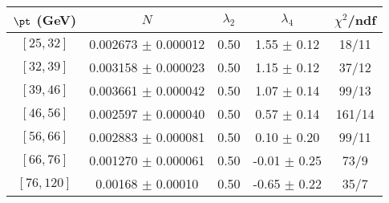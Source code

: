 \begin{tabular}{c||c|c|c|c}
$\pt$ (GeV) & $N$ & $\lambda_{2}$ & $\lambda_4$  & $\chi^2$/ndf  \\
\hline
$[25, 32]$ & 0.002673 $\pm$ 0.000012 & 0.50 & 1.55 $\pm$ 0.12 & 18/11\\
$[32, 39]$ & 0.003158 $\pm$ 0.000023 & 0.50 & 1.15 $\pm$ 0.12 & 37/12\\
$[39, 46]$ & 0.003661 $\pm$ 0.000042 & 0.50 & 1.07 $\pm$ 0.14 & 99/13\\
$[46, 56]$ & 0.002597 $\pm$ 0.000040 & 0.50 & 0.57 $\pm$ 0.14 & 161/14\\
$[56, 66]$ & 0.002883 $\pm$ 0.000081 & 0.50 & 0.10 $\pm$ 0.20 & 99/11\\
$[66, 76]$ & 0.001270 $\pm$ 0.000061 & 0.50 & -0.01 $\pm$ 0.25 & 73/9\\
$[76, 120]$ & 0.00168 $\pm$ 0.00010 & 0.50 & -0.65 $\pm$ 0.22 & 35/7\\
\end{tabular}
